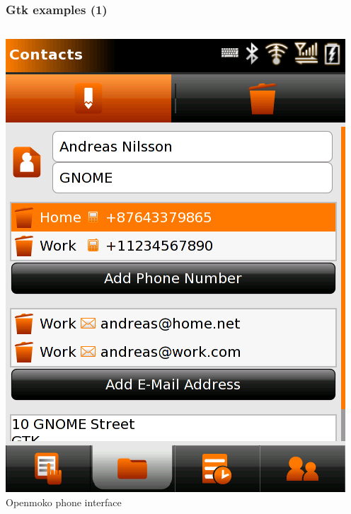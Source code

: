 \begin{frame}
  \frametitle{Gtk examples (1)}
  \begin{columns}
    \includegraphics[width=\textwidth]{slides/sysdev-embedded-linux/openmoko-gui.png}\\
    Openmoko phone interface
  \end{columns}
\end{frame}

